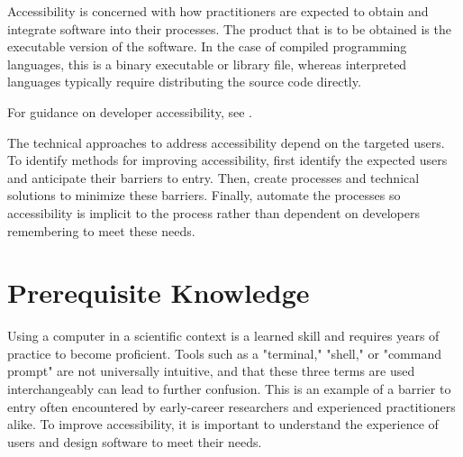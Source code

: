 \documentclass[]{nrel}
\begin{document}
Accessibility is concerned with how practitioners are expected to obtain and integrate software
into their processes. The product that is to be obtained is the executable version of the software.
In the case of compiled programming languages, this is a binary executable or library file,
whereas interpreted languages typically require distributing the source code directly.

For guidance on developer accessibility, see .

The technical approaches to address accessibility depend on the targeted users.
To identify methods for improving accessibility, first identify the expected users and
anticipate their barriers to entry.
Then, create processes and technical solutions to minimize these barriers.
Finally, automate the processes so accessibility is implicit to the process rather than
dependent on developers remembering to meet these needs.

\section{Prerequisite Knowledge}

Using a computer in a scientific context is a learned skill and requires years of practice to
become proficient. Tools such as a "terminal," "shell," or "command prompt" are not universally
intuitive, and that these three terms are used interchangeably can lead to further confusion.
This is an example of a barrier to entry often encountered by early-career researchers and
experienced practitioners alike. To improve accessibility, it is important to
understand the experience of users and design software to meet their needs.
\end{document}

